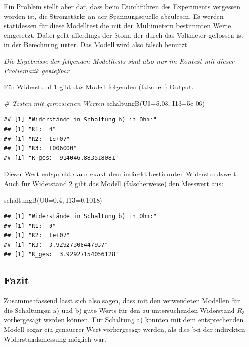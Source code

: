 \documentclass[
  9pt,
]{article}
\newenvironment{Shaded}{\begin{snugshade}}{\end{snugshade}}
\newcommand{\AttributeTok}[1]{\textcolor[rgb]{0.77,0.63,0.00}{#1}}
\newcommand{\CommentTok}[1]{\textcolor[rgb]{0.56,0.35,0.01}{\textit{#1}}}
\newcommand{\FloatTok}[1]{\textcolor[rgb]{0.00,0.00,0.81}{#1}}
\newcommand{\FunctionTok}[1]{\textcolor[rgb]{0.00,0.00,0.00}{#1}}
\newcommand{\NormalTok}[1]{#1}
\begin{document}
Ein Problem stellt aber dar, dass beim Durchführen des Experiments
vergessen worden ist, die Stromstärke an der Spannungsquelle abzulesen.
Es werden stattdessen für diese Modelltest die mit den Multimetern
bestimmten Werte eingesetzt. Dabei geht allerdings der Stom, der durch
das Voltmeter geflossen ist in der Berechnung unter. Das Modell wird
also falsch benutzt.

\emph{Die Ergebnisse der folgenden Modelltests sind also nur im Kontext
mit dieser Problematik genießbar}

Für Widerstand 1 gibt das Modell folgenden (falschen) Output:

\begin{Shaded}
\begin{Highlighting}[]
\CommentTok{\# Testen mit gemessenen Werten}
\FunctionTok{schaltungB}\NormalTok{(}\AttributeTok{U0=}\FloatTok{5.03}\NormalTok{, }\AttributeTok{I13=}\FloatTok{5e{-}06}\NormalTok{)}
\end{Highlighting}
\end{Shaded}

\begin{verbatim}
## [1] "Widerstände in Schaltung b) in Ohm:"
## [1] "R1:  0"
## [1] "R2:  1e+07"
## [1] "R3:  1006000"
## [1] "R_ges:  914046.883518081"
\end{verbatim}

Dieser Wert entspricht dann exakt dem indirekt bestimmten
Widerstandswert. Auch für Widerstand 2 gibt das Modell (falscherweise)
den Messwert aus:

\begin{Shaded}
\begin{Highlighting}[]
\FunctionTok{schaltungB}\NormalTok{(}\AttributeTok{U0=}\FloatTok{0.4}\NormalTok{, }\AttributeTok{I13=}\FloatTok{0.1018}\NormalTok{)}
\end{Highlighting}
\end{Shaded}

\begin{verbatim}
## [1] "Widerstände in Schaltung b) in Ohm:"
## [1] "R1:  0"
## [1] "R2:  1e+07"
## [1] "R3:  3.92927308447937"
## [1] "R_ges:  3.92927154056128"
\end{verbatim}

\hypertarget{fazit}{%
\subsection{Fazit}\label{fazit}}

Zusammenfassend lässt sich also sagen, dass mit den verwendeten Modellen
für die Schaltungen a) und b) gute Werte für den zu untersuchenden
Widerstand \(R_3\) vorhergesagt werden können. Für Schaltung a) konnten
mit dem entsprechenden Modell sogar ein genauerer Wert vorhergesagt
werden, als dies bei der indirekten Widerstandsmessung möglich war.
\end{document}
